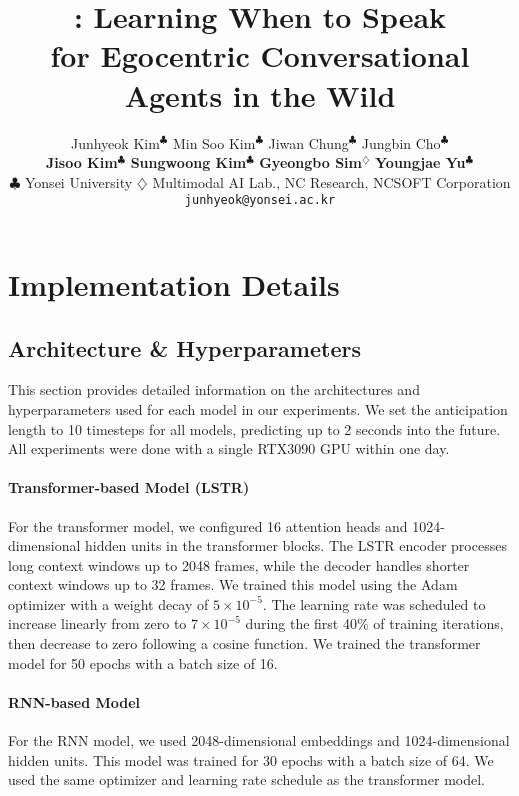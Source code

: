 \documentclass[11pt]{article}
\title{\modelname: Learning When to Speak\\ for Egocentric Conversational Agents in the Wild}
\author{
Junhyeok Kim$^{\clubsuit}$ \quad
Min Soo Kim$^{\clubsuit}$ \quad
Jiwan Chung$^{\clubsuit}$ \quad
Jungbin Cho$^{\clubsuit}$\\
\textbf{Jisoo Kim}$^{\clubsuit}$ \quad
\textbf{Sungwoong Kim}$^{\clubsuit}$ \quad
\textbf{Gyeongbo Sim}$^{\diamondsuit}$ \quad
\textbf{Youngjae Yu}$^{\clubsuit}$\\
\small{$\clubsuit$ Yonsei University} \quad
\small{$\diamondsuit$ Multimodal AI Lab., NC Research, NCSOFT Corporation} \\
\texttt{junhyeok@yonsei.ac.kr}
}
\begin{document}
\maketitle











% 
% 

\clearpage
\appendix
\section{Implementation Details}
\label{app:implementation}
\subsection{Architecture \& Hyperparameters}
\label{app:arch_hyper}
This section provides detailed information on the architectures and hyperparameters used for each model in our experiments. We set the anticipation length to 10 timesteps for all models, predicting up to 2 seconds into the future. All experiments were done with a single RTX3090 GPU within one day.

\paragraph{Transformer-based Model (LSTR)}
For the transformer model, we configured 16 attention heads and 1024-dimensional hidden units in the transformer blocks. The LSTR encoder processes long context windows up to 2048 frames, while the decoder handles shorter context windows up to 32 frames. We trained this model using the Adam optimizer \cite{kingma2014adam} with a weight decay of $5 \times 10^{-5}$. The learning rate was scheduled to increase linearly from zero to $7 \times 10^{-5}$ during the first 40\% of training iterations, then decrease to zero following a cosine function. We trained the transformer model for 50 epochs with a batch size of 16.

\paragraph{RNN-based Model}
For the RNN model, we used 2048-dimensional embeddings and 1024-dimensional hidden units. This model was trained for 30 epochs with a batch size of 64. We used the same optimizer and learning rate schedule as the transformer model.
\end{document}
